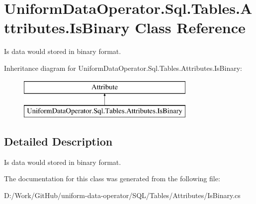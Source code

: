 \hypertarget{class_uniform_data_operator_1_1_sql_1_1_tables_1_1_attributes_1_1_is_binary}{}\section{Uniform\+Data\+Operator.\+Sql.\+Tables.\+Attributes.\+Is\+Binary Class Reference}
\label{class_uniform_data_operator_1_1_sql_1_1_tables_1_1_attributes_1_1_is_binary}


Is data would stored in binary format.  


Inheritance diagram for Uniform\+Data\+Operator.\+Sql.\+Tables.\+Attributes.\+Is\+Binary\+:\begin{figure}[H]
\begin{center}
\leavevmode
\includegraphics[height=2.000000cm]{d2/da0/class_uniform_data_operator_1_1_sql_1_1_tables_1_1_attributes_1_1_is_binary}
\end{center}
\end{figure}


\subsection{Detailed Description}
Is data would stored in binary format. 



The documentation for this class was generated from the following file\+:\begin{DoxyCompactItemize}
\item 
D\+:/\+Work/\+Git\+Hub/uniform-\/data-\/operator/\+S\+Q\+L/\+Tables/\+Attributes/Is\+Binary.\+cs\end{DoxyCompactItemize}
